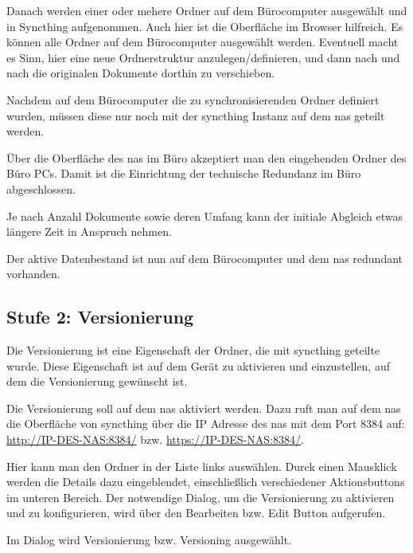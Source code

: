 Danach werden einer oder mehere Ordner auf dem Bürocomputer ausgewählt und in
Syncthing aufgenommen. Auch hier ist die Oberfläche im Browser hilfreich. Es
können alle Ordner auf dem Bürocomputer ausgewählt werden. Eventuell macht es
Sinn, hier eine neue Ordnerstruktur anzulegen/definieren, und dann nach und
nach die originalen Dokumente dorthin zu verschieben.
\bigskip

Nachdem auf dem Bürocomputer die zu synchronisierenden Ordner definiert wurden,
müssen diese nur noch mit der \gls{syncthing} Instanz auf dem \gls{nas}
geteilt werden.


Über die Oberfläche des \gls{nas} im Büro akzeptiert man den eingehenden
Ordner des Büro PCs. Damit ist die Einrichtung der technische Redundanz
im Büro abgeschlossen.
\bigskip

 Je nach Anzahl Dokumente sowie deren Umfang kann der
initiale Abgleich etwas längere Zeit in Anspruch nehmen.
\bigskip

 Der aktive Datenbestand ist nun auf dem Bürocomputer
und dem \gls{nas} redundant vorhanden.

\subsection{Stufe 2: Versionierung}
\label{sec:Stufe 2: Versionierung}

Die Versionierung ist eine Eigenschaft der Ordner, die mit \gls{syncthing}
geteilte wurde. Diese Eigenschaft ist auf dem Gerät zu aktivieren und
einzustellen, auf dem die Versionierung gewünscht ist.
\bigskip

Die Versionierung soll auf dem \gls{nas} aktiviert werden. Dazu ruft man auf dem
\gls{nas} die Oberfläche von \gls{syncthing} über die IP Adresse des \gls{nas}
mit dem Port 8384 auf: \href{http://IP-DES-NAS:8384/}{http://IP-DES-NAS:8384/}
bzw. \href{https://IP-DES-NAS:8384/}{https://IP-DES-NAS:8384/}.
\bigskip

Hier kann man den Ordner in der Liste links auswählen. Durck einen Mausklick
werden die Details dazu eingeblendet, einschließlich verschiedener
Aktionsbuttons im unteren Bereich. Der notwendige Dialog, um die Versionierung
zu aktivieren und zu konfigurieren, wird über den Bearbeiten bzw. Edit Button
aufgerufen.
\bigskip

Im Dialog wird Versionierung bzw. Versioning ausgewählt.

